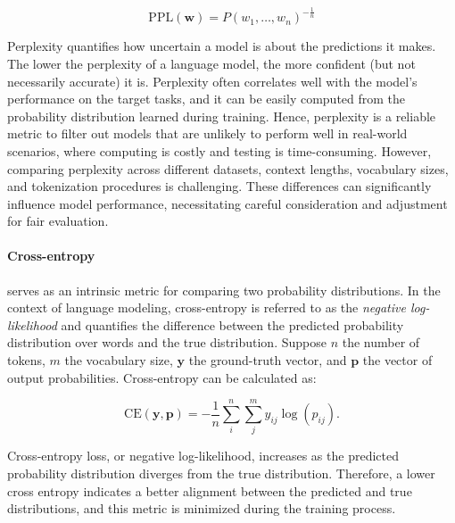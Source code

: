 \begin{equation}
    \text{PPL}(\bm{w}) = P(w_1, \ldots, w_n)^{-\frac{1}{n}}
\end{equation}

Perplexity quantifies how uncertain a model is about the predictions it makes. The lower the perplexity of a language model, the more confident (but not necessarily accurate) it is. Perplexity often correlates well with the model's performance on the target tasks, and it can be easily computed from the probability distribution learned during training. Hence, perplexity is a reliable metric to filter out models that are unlikely to perform well in real-world scenarios, where computing is costly and testing is time-consuming. However, comparing perplexity across different datasets, context lengths, vocabulary sizes, and tokenization procedures is challenging. These differences can significantly influence model performance, necessitating careful consideration and adjustment for fair evaluation.

\paragraph{Cross-entropy} serves as an intrinsic metric for comparing two probability distributions. In the context of language modeling, cross-entropy is referred to as the \textit{negative log-likelihood} and quantifies the difference between the predicted probability distribution over words and the true distribution. Suppose $n$ the number of tokens, $m$ the vocabulary size, $\bm{y}$ the ground-truth vector, and $\bm{p}$ the vector of output probabilities. Cross-entropy can be calculated as:

\begin{equation}
    \text{CE}(\bm{y}, \bm{p}) = - \dfrac{1}{n} \sum_{i}^n \sum_{j}^m y_{ij} \log (p_{ij}).
\end{equation}

\noindent Cross-entropy loss, or negative log-likelihood, increases as the predicted probability distribution diverges from the true distribution. Therefore, a lower cross entropy indicates a better alignment between the predicted and true distributions, and this metric is minimized during the training process.



